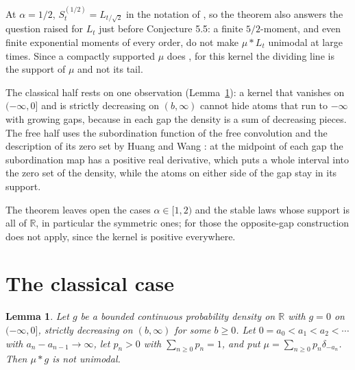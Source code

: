 \documentclass[11pt]{amsart}
\newtheorem{lemma}[theorem]{Lemma}
\theoremstyle{definition}
\theoremstyle{remark}
\numberwithin{equation}{section}
\newcommand{\R}{\mathbb R}
\begin{document}
At $\alpha=1/2$, $S^{(1/2)}_t=L_{t/\sqrt2}$ in the notation of \cite{HU}, so the theorem also answers the question raised for $L_t$ just before Conjecture 5.5: a finite $5/2$-moment, and even finite exponential moments of every order, do not make $\mu*L_t$ unimodal at large times. Since a compactly supported $\mu$ does \cite[Theorem 5.3]{HU}, for this kernel the dividing line is the support of $\mu$ and not its tail.

The classical half rests on one observation (Lemma~\ref{lem:classical}): a kernel that vanishes on $(-\infty,0]$ and is strictly decreasing on $(b,\infty)$ cannot hide atoms that run to $-\infty$ with growing gaps, because in each gap the density is a sum of decreasing pieces. The free half uses the subordination function of the free convolution and the description of its zero set by Huang and Wang \cite{HW}: at the midpoint of each gap the subordination map has a positive real derivative, which puts a whole interval into the zero set of the density, while the atoms on either side of the gap stay in its support.

The theorem leaves open the cases $\alpha\in[1,2)$ and the stable laws whose support is all of $\R$, in particular the symmetric ones; for those the opposite-gap construction does not apply, since the kernel is positive everywhere.

\section{The classical case}\label{sec:classical}

\begin{lemma}\label{lem:classical}
Let $g$ be a bounded continuous probability density on $\R$ with $g=0$ on $(-\infty,0]$, strictly decreasing on $(b,\infty)$ for some $b\ge0$. Let $0=a_0<a_1<a_2<\cdots$ with $a_n-a_{n-1}\to\infty$, let $p_n>0$ with $\sum_{n\ge0}p_n=1$, and put $\mu=\sum_{n\ge0}p_n\delta_{-a_n}$. Then $\mu*g$ is not unimodal.
\end{lemma}
\end{document}
